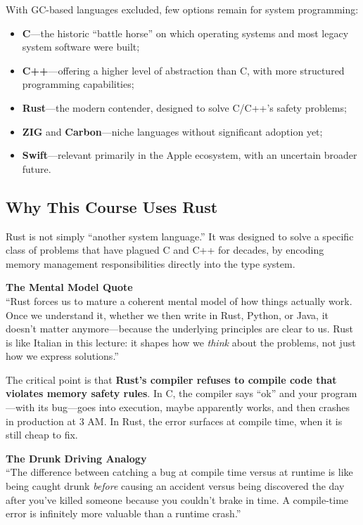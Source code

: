 With GC-based languages excluded, few options remain for system programming:
\begin{itemize}
    \item \textbf{C}---the historic ``battle horse'' on which operating systems and most legacy system software were built;
    \item \textbf{C++}---offering a higher level of abstraction than C, with more structured programming capabilities;
    \item \textbf{Rust}---the modern contender, designed to solve C/C++'s safety problems;
    \item \textbf{ZIG} and \textbf{Carbon}---niche languages without significant adoption yet;
    \item \textbf{Swift}---relevant primarily in the Apple ecosystem, with an uncertain broader future.
\end{itemize}

\subsection{Why This Course Uses Rust}

Rust is not simply ``another system language.'' It was designed to solve a specific class of problems that have plagued C and C++ for decades, by encoding memory management responsibilities directly into the type system.

\begin{insightbox}
\textbf{The Mental Model Quote} \\
``Rust forces us to mature a coherent mental model of how things actually work. Once we understand it, whether we then write in Rust, Python, or Java, it doesn't matter anymore---because the underlying principles are clear to us. Rust is like Italian in this lecture: it shapes how we \emph{think} about the problems, not just how we express solutions.''
\end{insightbox}

The critical point is that \textbf{Rust's compiler refuses to compile code that violates memory safety rules}. In C, the compiler says ``ok'' and your program---with its bug---goes into execution, maybe apparently works, and then crashes in production at 3 AM. In Rust, the error surfaces at compile time, when it is still cheap to fix.

\begin{insightbox}
\textbf{The Drunk Driving Analogy} \\
``The difference between catching a bug at compile time versus at runtime is like being caught drunk \emph{before} causing an accident versus being discovered the day after you've killed someone because you couldn't brake in time. A compile-time error is infinitely more valuable than a runtime crash.''
\end{insightbox}

